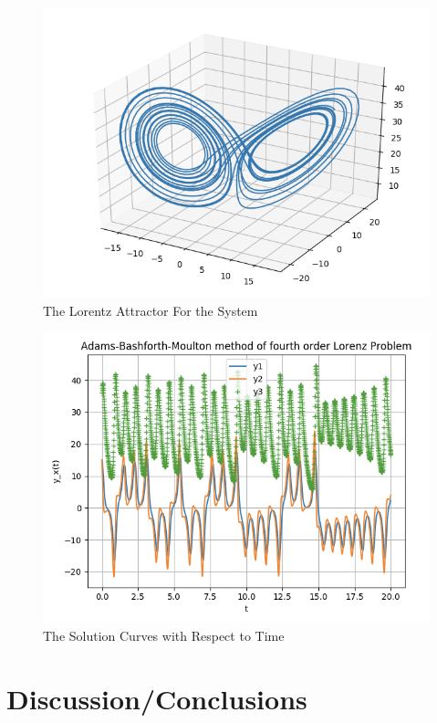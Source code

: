 \documentclass[11pt]{article}
\begin{document}
\begin{figure} [h]
\centering
        \includegraphics[totalheight=10cm]{figure8.png}
    \caption{The Lorentz Attractor For the System}
    \label{figure1}
\end{figure}

\newpage

\begin{figure} [h]
\centering
        \includegraphics[totalheight=10cm]{original.png}
    \caption{The Solution Curves with Respect to Time}
    \label{figure2}
\end{figure}

\section{Discussion/Conclusions}\label{S:5}
\end{document}

